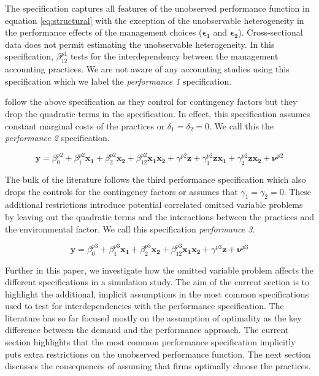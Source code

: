 \documentclass[12pt]{article}
\begin{document}
The specification captures all features of the unobserved performance
function in equation \eqref{eq:structural} with the exception of the
unobservable heterogeneity in the performance effects of the management
choices (\(\mathbf{\epsilon_1}\) and \(\mathbf{\epsilon_2}\)).
Cross-sectional data does not permit estimating the unobservable
heterogeneity. In this specification, \(\beta_{12}^{p1}\) tests for the
interdependency between the management accounting practices. We are not
aware of any accounting studies using this specification which we label
the \emph{performance 1} specification.

\citet{Bedford2016} follow the above specification as they control for
contingency factors but they drop the quadratic terms in the
specification. In effect, this specification assumes constant marginal
costs of the practices or \(\delta_1 = \delta_2 = 0\). We call this the
\emph{performance 2} specification.

\[
\mathbf{y} = \beta^{p2}_0 + \beta^{p2}_1 \mathbf{x_1} + \beta^{p2}_2 \mathbf{x_2}
  + \beta^{p2}_{12} \mathbf{x_1} \mathbf{x_2} + \gamma^{p2} \mathbf{z} +
  \gamma^{p2}_{1} \mathbf{z} \mathbf{x_1} +
  \gamma^{p2}_{2} \mathbf{z} \mathbf{x_2} +
  \mathbf{\nu}^{p2}
\]

The bulk of the literature follows the third performance specification
which also drops the controls for the contingency factors or assumes
that \(\gamma_1 = \gamma_2 = 0\). These additional restrictions
introduce potential correlated omitted variable problems by leaving out
the quadratic terms and the interactions between the practices and the
environmental factor. We call this specification \emph{performance 3}.

\[
\mathbf{y} = \beta^{p3}_0 + \beta^{p3}_1 \mathbf{x_1} + \beta^{p3}_2 \mathbf{x_2}
  + \beta^{p3}_{12} \mathbf{x_1} \mathbf{x_2} + \gamma^{p3} \mathbf{z} +
  \mathbf{\nu}^{p3}
\]

Further in this paper, we investigate how the omitted variable problem
affects the different specifications in a simulation study. The aim of
the current section is to highlight the additional, implicit assumptions
in the most common specifications used to test for interdependencies
with the performance specification. The literature has so far focused
mostly on the assumption of optimality as the key difference between the
demand and the performance approach. The current section highlights that
the most common performance specification implicitly puts extra
restrictions on the unobserved performance function. The next section
discusses the consequences of assuming that firms optimally choose the
practices.
\end{document}

